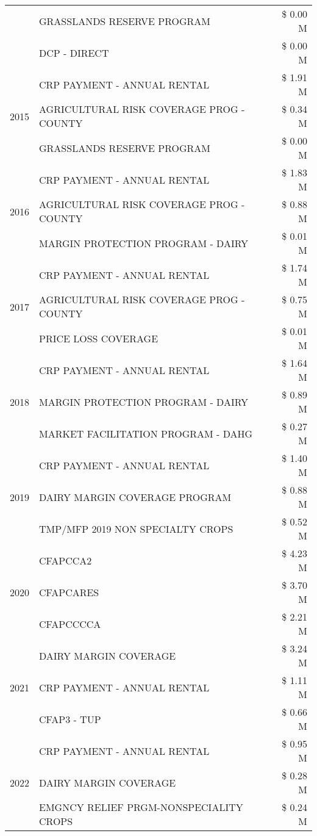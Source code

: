 \begin{tabular}{llr}
 & GRASSLANDS RESERVE PROGRAM & \$ 0.00 M \\
 & DCP - DIRECT & \$ 0.00 M \\
\cline{1-3}
\multirow[t]{3}{*}{2015} & CRP PAYMENT - ANNUAL RENTAL & \$ 1.91 M \\
 & AGRICULTURAL RISK COVERAGE PROG - COUNTY & \$ 0.34 M \\
 & GRASSLANDS RESERVE PROGRAM & \$ 0.00 M \\
\cline{1-3}
\multirow[t]{3}{*}{2016} & CRP PAYMENT - ANNUAL RENTAL & \$ 1.83 M \\
 & AGRICULTURAL RISK COVERAGE PROG - COUNTY & \$ 0.88 M \\
 & MARGIN PROTECTION PROGRAM - DAIRY & \$ 0.01 M \\
\cline{1-3}
\multirow[t]{3}{*}{2017} & CRP PAYMENT - ANNUAL RENTAL & \$ 1.74 M \\
 & AGRICULTURAL RISK COVERAGE PROG - COUNTY & \$ 0.75 M \\
 & PRICE LOSS COVERAGE & \$ 0.01 M \\
\cline{1-3}
\multirow[t]{3}{*}{2018} & CRP PAYMENT - ANNUAL RENTAL & \$ 1.64 M \\
 & MARGIN PROTECTION PROGRAM - DAIRY & \$ 0.89 M \\
 & MARKET FACILITATION PROGRAM - DAHG & \$ 0.27 M \\
\cline{1-3}
\multirow[t]{3}{*}{2019} & CRP PAYMENT - ANNUAL RENTAL & \$ 1.40 M \\
 & DAIRY MARGIN COVERAGE PROGRAM & \$ 0.88 M \\
 & TMP/MFP 2019 NON SPECIALTY CROPS & \$ 0.52 M \\
\cline{1-3}
\multirow[t]{3}{*}{2020} & CFAPCCA2 & \$ 4.23 M \\
 & CFAPCARES & \$ 3.70 M \\
 & CFAPCCCCA & \$ 2.21 M \\
\cline{1-3}
\multirow[t]{3}{*}{2021} & DAIRY MARGIN COVERAGE & \$ 3.24 M \\
 & CRP PAYMENT - ANNUAL RENTAL & \$ 1.11 M \\
 & CFAP3 - TUP & \$ 0.66 M \\
\cline{1-3}
\multirow[t]{3}{*}{2022} & CRP PAYMENT - ANNUAL RENTAL & \$ 0.95 M \\
 & DAIRY MARGIN COVERAGE & \$ 0.28 M \\
 & EMGNCY RELIEF PRGM-NONSPECIALITY CROPS & \$ 0.24 M \\
\cline{1-3}
\bottomrule
\end{tabular}
